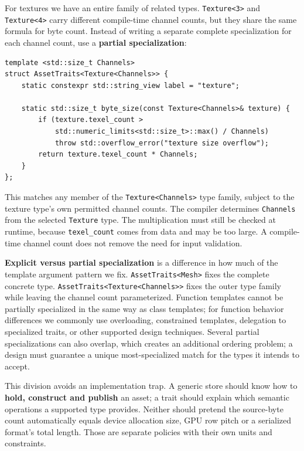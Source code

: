 For textures we have an entire family of related types. \texttt{Texture\textless{}3\textgreater{}} and \texttt{Texture\textless{}4\textgreater{}} carry different compile-time channel counts, but they share the same formula for byte count. Instead of writing a separate complete specialization for each channel count, use a \textbf{partial specialization}:

\begin{verbatim}
template <std::size_t Channels>
struct AssetTraits<Texture<Channels>> {
    static constexpr std::string_view label = "texture";

    static std::size_t byte_size(const Texture<Channels>& texture) {
        if (texture.texel_count >
            std::numeric_limits<std::size_t>::max() / Channels)
            throw std::overflow_error("texture size overflow");
        return texture.texel_count * Channels;
    }
};
\end{verbatim}

This matches any member of the \texttt{Texture\textless{}Channels\textgreater{}} type family, subject to the texture type's own permitted channel counts. The compiler determines \texttt{Channels} from the selected \texttt{Texture} type. The multiplication must still be checked at runtime, because \texttt{texel\_count} comes from data and may be too large. A compile-time channel count does not remove the need for input validation.

\textbf{Explicit versus partial specialization} is a difference in how much of the template argument pattern we fix. \texttt{AssetTraits\textless{}Mesh\textgreater{}} fixes the complete concrete type. \texttt{AssetTraits\textless{}Texture\textless{}Channels\textgreater{}\textgreater{}} fixes the outer type family while leaving the channel count parameterized. Function templates cannot be partially specialized in the same way as class templates; for function behavior differences we commonly use overloading, constrained templates, delegation to specialized traits, or other supported design techniques. Several partial specializations can also overlap, which creates an additional ordering problem; a design must guarantee a unique most-specialized match for the types it intends to accept.

This division avoids an implementation trap. A generic store should know how to \textbf{hold, construct and publish} an asset; a trait should explain which semantic operations a supported type provides. Neither should pretend the source-byte count automatically equals device allocation size, GPU row pitch or a serialized format's total length. Those are separate policies with their own units and constraints.

